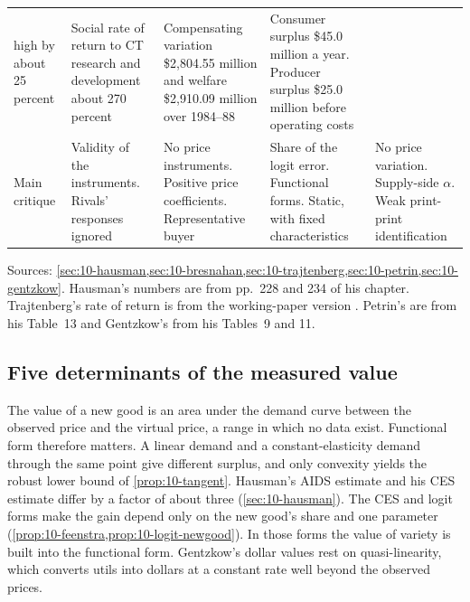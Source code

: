 \begin{table}[htbp]
\begin{tabularx}{\textwidth}{@{}>{\raggedright\arraybackslash}p{2.05cm}
  >{\raggedright\arraybackslash}X >{\raggedright\arraybackslash}X
  >{\raggedright\arraybackslash}X >{\raggedright\arraybackslash}X@{}}
  high by about 25 percent & Social rate of return to CT research and development about 270 percent & Compensating
  variation \$2,804.55 million and welfare \$2,910.09 million over 1984--88 & Consumer surplus \$45.0 million a year.
  Producer surplus \$25.0 million before operating costs \\
Main critique & Validity of the instruments. Rivals' responses ignored & No price instruments. Positive price
  coefficients. Representative buyer & Share of the logit error. Functional forms. Static, with fixed characteristics &
  No price variation. Supply-side $\alpha$. Weak print-print identification \\
\bottomrule
\end{tabularx}

\smallskip
\begin{minipage}{0.97\textwidth}
\footnotesize Sources: \cref{sec:10-hausman,sec:10-bresnahan,sec:10-trajtenberg,sec:10-petrin,sec:10-gentzkow}.
Hausman's numbers are from pp.~228 and 234 of his chapter. Trajtenberg's rate of return is from the working-paper
version \citep[p.~73]{Trajtenberg1985}. Petrin's are from his Table~13 and Gentzkow's from his Tables~9 and 11.
\end{minipage}
\end{table}

\subsection{Five determinants of the measured value}\label{sec:10-synthesis-lessons}

 The value of a new good is an area under the demand curve between the
observed price and the virtual price, a range in which no data exist. Functional form therefore matters. A linear
demand and a constant-elasticity demand through the same point give different surplus, and only convexity yields the
robust lower bound of \cref{prop:10-tangent}. Hausman's AIDS estimate and his CES estimate differ by a factor of about
three (\cref{sec:10-hausman}). The CES and logit forms make the gain depend only on the new good's share and one
parameter (\cref{prop:10-feenstra,prop:10-logit-newgood}). In those forms the value of variety is built into the
functional form. Gentzkow's dollar values rest on quasi-linearity, which converts utils into dollars at a constant rate
well beyond the observed prices.

